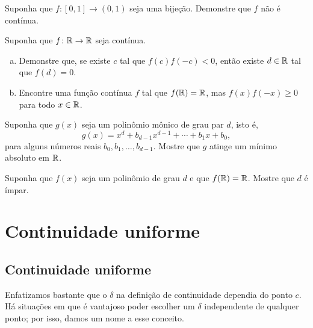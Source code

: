 \begin{exercise}
Suponha que $f \colon [0,1] \to (0,1)$ seja uma bijeção. Demonstre que $f$ não é
contínua.
\end{exercise}

\begin{exercise}
Suponha que $f \colon {\mathbb{R}} \to {\mathbb{R}}$ seja contínua.
\begin{enumerate}[a)]
\item
Demonstre que, se existe $c$ tal que $f(c)f(-c) < 0$,
então existe $d \in {\mathbb{R}}$ tal que $f(d) = 0$.
\item
Encontre uma função contínua $f$ tal que
$f({\mathbb{R}}) = {\mathbb{R}}$, mas $f(x)f(-x) \geq 0$ para todo $x \in {\mathbb{R}}$.
\end{enumerate}
\end{exercise}

\begin{exercise}
Suponha que $g(x)$ seja um polinômio mônico de grau par $d$, isto é,
\begin{equation*}
g(x) = x^d + b_{d-1} x^{d-1} + \cdots + b_1 x + b_0 ,
\end{equation*}
para alguns números reais $b_{0}, b_1, \ldots, b_{d-1}$.
Mostre que $g$ atinge um mínimo absoluto em ${\mathbb{R}}$.
\end{exercise}

\begin{exercise}
Suponha que $f(x)$ seja um polinômio de grau $d$ e que
$f({\mathbb{R}}) = {\mathbb{R}}$. Mostre que $d$ é ímpar.
\end{exercise}


\sectionnewpage
\section{Continuidade uniforme}
\label{sec:unifcont}



\subsection{Continuidade uniforme}

Enfatizamos bastante que o $\delta$ na definição de continuidade dependia
do ponto $c$. Há situações em que é vantajoso poder escolher um $\delta$
independente de qualquer ponto; por isso, damos um nome a esse conceito.

